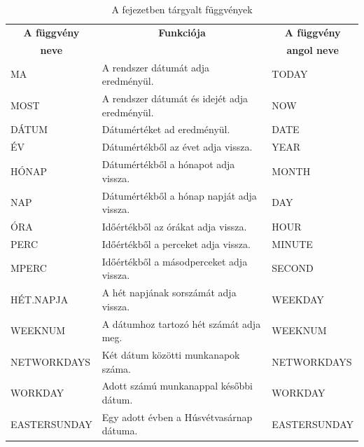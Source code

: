 \begin{table}[!h]
\begin{center}
\caption{A fejezetben tárgyalt függvények}\label{14-fejezetFüggvények}
\begin{tabular}{|m{3cm}|m{8cm}|m{3cm}|}
\hline
\multicolumn{1}{|c|}{\textbf{A függvény}}&
\multicolumn{1}{c|}{\textbf{Funkciója}}&
\multicolumn{1}{c|}{\textbf{A függvény}} \\
\multicolumn{1}{|c|}{\textbf{neve}} & &
\multicolumn{1}{c|}{\textbf{angol neve}} \\
\hline
MA & A rendszer dátumát adja eredményül. & TODAY\\ \hline
MOST & A rendszer dátumát és idejét adja eredményül. & NOW\\ \hline
DÁTUM & Dátumértéket ad eredményül. & DATE\\ \hline
ÉV & Dátumértékből az évet adja vissza. & YEAR\\ \hline
HÓNAP & Dátumértékből a hónapot adja vissza. & MONTH\\ \hline
NAP & Dátumértékből a hónap napját adja vissza. & DAY\\ \hline
ÓRA & Időértékből az órákat adja vissza. & HOUR\\ \hline
PERC & Időértékből a perceket adja vissza. & MINUTE\\ \hline
MPERC & Időértékből a másodperceket adja vissza. & SECOND\\ \hline
HÉT.NAPJA & A hét napjának sorszámát adja vissza. & WEEKDAY\\ \hline
WEEKNUM & A dátumhoz tartozó hét számát adja meg. & WEEKNUM\\ \hline
NETWORKDAYS & Két dátum közötti munkanapok száma. & NETWORKDAYS\\ \hline
WORKDAY & Adott számú munkanappal későbbi dátum. & WORKDAY\\ \hline
EASTERSUNDAY & Egy adott évben a Húsvétvasárnap dátuma. & EASTERSUNDAY\\ \hline
\end{tabular}
\end{center}
\end{table}
